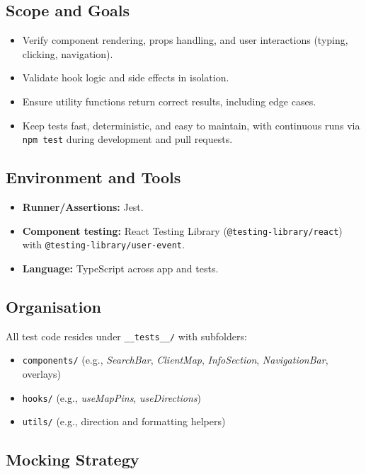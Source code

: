 \subsection{Scope and Goals}
\begin{itemize}
    \item Verify component rendering, props handling, and user interactions (typing, clicking, navigation).
    \item Validate hook logic and side effects in isolation.
    \item Ensure utility functions return correct results, including edge cases.
    \item Keep tests fast, deterministic, and easy to maintain, with continuous runs via \texttt{npm test} during development and pull requests.
\end{itemize}


\subsection{Environment and Tools}
\begin{itemize}
    \item \textbf{Runner/Assertions:} Jest.
    \item \textbf{Component testing:} React Testing Library (\texttt{@testing-library/react}) with \texttt{@testing-library/user-event}.
    \item \textbf{Language:} TypeScript across app and tests.
\end{itemize}

\subsection{Organisation}
All test code resides under \texttt{\_\_tests\_\_/} with subfolders:
\begin{itemize}
    \item \texttt{components/} (e.g., \textit{SearchBar}, \textit{ClientMap}, \textit{InfoSection}, \textit{NavigationBar}, overlays)
    \item \texttt{hooks/} (e.g., \textit{useMapPins}, \textit{useDirections})
    \item \texttt{utils/} (e.g., direction and formatting helpers)
\end{itemize}

\subsection{Mocking Strategy}

